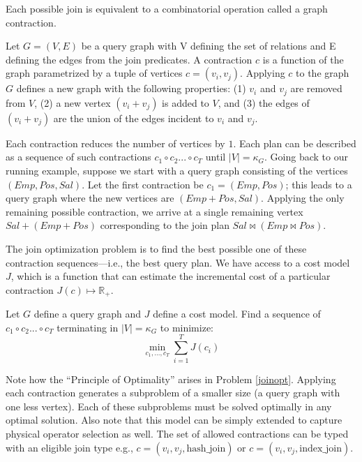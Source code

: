 Each possible join is equivalent to a combinatorial operation called a graph contraction.

\begin{definition}[Contraction]
Let $G = (V,E)$ be a query graph with V defining the set of relations and E defining the edges from the join predicates. A contraction $c$ is a function of the graph parametrized by a tuple of vertices $c=(v_i, v_j)$. Applying $c$ to the graph $G$ defines a new graph with the following properties: (1) $v_i$ and $v_j$ are removed from $V$, (2) a new vertex $(v_i+v_j)$ is added to $V$, and (3) the edges of $(v_i+v_j)$ are the union of the edges incident to $v_i$ and $v_j$. 
\end{definition}

Each contraction reduces the number of vertices by $1$. Each plan can be described as a sequence of such contractions $c_1 \circ c_2 ...\circ c_{T}$ until $|V| = \kappa_G$. Going back to our running example, suppose we start with a query graph consisting of the vertices $(Emp, Pos, Sal)$. Let the first contraction be $c_1 = (Emp, Pos)$; this leads to a query graph where the new vertices are $(Emp+Pos, Sal)$. Applying the only remaining possible contraction, we arrive at a single remaining vertex $Sal+(Emp+Pos)$ corresponding to the join plan $Sal \bowtie (Emp \bowtie Pos)$. 

The join optimization problem is to find the best possible one of these contraction sequences---i.e., the best query plan. We have access to a cost model $J$, which is a function that can estimate the incremental cost of a particular contraction $J(c) \mapsto \mathbb{R}_+$. 

\begin{problem}
Let $G$ define a query graph and $J$ define a cost model. Find a sequence of $c_1 \circ c_2 ...\circ c_{T}$ terminating in $|V| = \kappa_G$ to minimize:
\[
\min_{c_1,...,c_T} \sum_{i=1}^T J(c_i)
\]\label{joinopt}
\end{problem}

Note how the ``Principle of Optimality'' arises in Problem \ref{joinopt}. Applying each contraction generates a subproblem of a smaller size (a query graph with one less vertex). Each of these subproblems must be solved optimally in any optimal solution. Also note that this model can be simply extended to capture physical operator selection as well. The set of allowed contractions can be typed with an eligible join type e.g., $c=(v_i, v_j, \text{hash\_join})$ or $c=(v_i, v_j, \text{index\_join})$.

